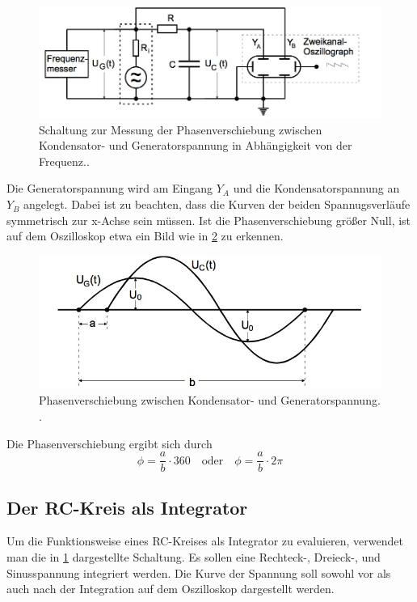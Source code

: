 \begin{figure}
  \centering
  \includegraphics[scale=0.5]{content/messung_phasenverschiebung.jpg}
  \caption{Schaltung zur Messung der Phasenverschiebung zwischen Kondensator- und Generatorspannung in Abhängigkeit von der Frequenz.\cite{anleitung353}.}
  \label{fig:phase-frequenz}
\end{figure}

Die Generatorspannung wird am Eingang $Y_A$ und die Kondensatorspannung an $Y_B$ angelegt. Dabei ist zu beachten, dass die Kurven der beiden Spannugsverläufe symmetrisch zur x-Achse sein müssen.
Ist die Phasenverschiebung größer Null, ist auf dem Oszilloskop etwa ein Bild wie in \ref{fig:phasenverschiebung} zu erkennen.

\begin{figure}
  \centering
  \includegraphics[scale=0.5]{content/Phasenverschiebung.jpg}
  \caption{Phasenverschiebung zwischen Kondensator- und Generatorspannung. \cite{anleitung353}.}
  \label{fig:phasenverschiebung}
\end{figure}

Die Phasenverschiebung ergibt sich durch
\begin{equation}
  \phi = \frac{a}{b} \cdot 360 \quad\text{oder}\quad \phi = \frac{a}{b} \cdot 2\pi
\end{equation}

\subsection{Der RC-Kreis als Integrator}
Um die Funktionsweise eines RC-Kreises als Integrator zu evaluieren, verwendet man die in \ref{fig:phase-frequenz} dargestellte Schaltung. Es sollen eine Rechteck-, Dreieck-, und Sinusspannung integriert werden. Die Kurve der Spannung soll sowohl vor als auch nach der Integration auf dem Oszilloskop dargestellt werden.
